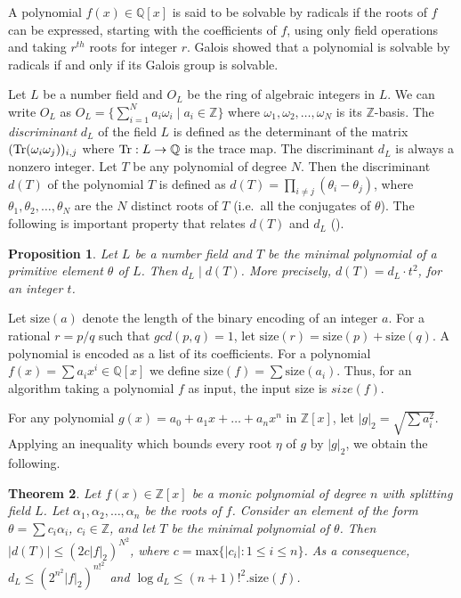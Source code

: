 \documentclass{article}
\newtheorem{theorem}{Theorem}[section]
\newtheorem{proposition}[theorem]{Proposition}
\newcommand{\Q}[0]{\ensuremath{\mathbb{Q}}}
\newcommand{\Z}[0]{\ensuremath{\mathbb{Z}}}
\newcommand{\size}[0]{\ensuremath{\mathrm{size}}}
\newcommand{\Tr}{\mbox{\rm Tr}}
\begin{document}
A polynomial $f(x) \in \Q[x]$ is said to be solvable by radicals if
the roots of $f$ can be expressed, starting with the coefficients of
$f$, using only field operations and taking $r^{th}$ roots for integer
$r$. Galois showed that a polynomial is solvable by radicals if and
only if its Galois group is solvable.

Let $L$ be a number field and $O_L$ be the ring of algebraic integers
in $L$. We can write $O_L$ as $O_L=\{\sum_{i=1}^N a_i\omega_i\mid
a_i\in\Z\}$ where $\omega_1,\omega_2,\ldots,\omega_N$ is its
$\Z$-basis. The \emph{discriminant} $d_L$ of the field $L$ is defined
as the determinant of the matrix $(\Tr(\omega_i\omega_j))_{i,j}$ where
$\Tr:L\rightarrow \Q$ is the trace map. The discriminant $d_L$ is
always a nonzero integer. Let $T$ be any polynomial of degree $N$.
Then the discriminant $d(T)$ of the polynomial $T$ is defined as $d(T)
= \prod_{i \ne j} (\theta_i - \theta_j)$, where
$\theta_1,\theta_2,\ldots,\theta_N$ are the $N$ distinct roots of $T$
(i.e.\ all the conjugates of $\theta$). The following is important
property that relates $d(T)$ and $d_L$ (\cite[Proposition
4.4.4]{cohen:1993}).

\begin{proposition}
  Let $L$ be a number field and $T$ be the minimal polynomial of a
  primitive element $\theta$ of $L$. Then $d_L\mid d(T)$. More
  precisely, $d(T) = d_L\cdot t^2$, for an integer $t$.
\end{proposition}

Let $\size(a)$ denote the length of the binary encoding of an integer
$a$. For a rational $r = p/q$ such that $gcd(p,q) =1$, let $\size(r) =
\size(p) + \size(q)$. A polynomial is encoded as a list of its
coefficients. For a polynomial $f(x) = \sum a_i x^i\in\Q[x]$ we define
$\size(f) = \sum \size(a_i)$. Thus, for an algorithm taking a
polynomial $f$ as input, the input size is $size(f)$.

For any polynomial $g(x) = a_0 + a_1 x + \ldots + a_n x^n$ in $\Z[x]$,
let $|g|_2 = \sqrt{\sum a_i^2}$. Applying an inequality
\cite{landau:1905:ineq} which bounds every root $\eta$ of $g$ by
$|g|_2$, we obtain the following.

\begin{theorem}\label{bound:d:theta}
  Let $f(x) \in \Z[x]$ be a monic polynomial of degree $n$ with
  splitting field $L$. Let $\alpha_1,\alpha_2,\ldots,\alpha_n$ be the
  roots of $f$. Consider an element of the form $\theta = \sum c_i
  \alpha_i$, $c_i\in \Z$, and let $T$ be the minimal polynomial of
  $\theta$. Then $|d(T)| \leq (2c|f|_2)^{N^2}$, where $c =
  {\mathrm{max}}\{ |c_i| : 1 \leq i \leq n \}$.  As a consequence,
  $d_L \leq (2^{n^2} |f|_2)^{n!^2}$ and $\log{d_L} \leq
  (n+1)!^2.\size(f)$.
\end{theorem}
\end{document}
